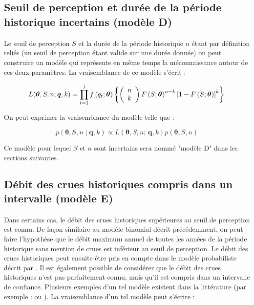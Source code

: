 	\subsection{Seuil de perception et durée de la période historique incertains (modèle D)}
	\label{subsec:modD}	
	
	\paragraph{}
	Le seuil de perception $S$ et la durée de la période historique $n$ étant par définition reliés (un seuil de perception étant valide sur une durée donnée) on peut construire un modèle qui représente en même temps la méconnaissance autour de ces deux paramètres. La vraisemblance de ce modèle s'écrit :  
	
					\begin{equation}
			L(\boldsymbol{\theta}, S, n ; \boldsymbol{q}, k) = \prod_{t=1}^j f\left(q_t;\boldsymbol{\theta}\right) \left\{\left(\begin{array}{l}
			n \\
			k
			\end{array}\right) F\left(S;\boldsymbol{\theta}\right)^{n-k}\left[1-F\left(S;\boldsymbol{\theta}\right)\right]^k\right\} \\
			\label{eq:Gev_Binom_SN}
			\end{equation}
		
		On peut exprimer la vraisemblance du modèle telle que :
					
			\begin{equation}
				p(\boldsymbol{\theta}, S, n \mid \boldsymbol{q},k) \propto L(\boldsymbol{\theta},S, n;\,\boldsymbol{q},k) p(\boldsymbol{\theta},S, n)
				\label{eq:Bayes_uSN}
			\end{equation}

	Ce modèle pour lequel $S$ et $n$ sont incertains sera nommé "modèle D" dans les sections suivantes. 
	
	\subsection{Débit des crues historiques compris dans un intervalle (modèle E)}
	\label{subsec:modE}	
		
	\paragraph{} Dans certains cas, le débit des crues historiques supérieures au seuil de perception est connu. De façon similaire au modèle binomial décrit précédemment, on peut faire l'hypothèse que le débit maximum annuel de toutes les années de la période historique sans mention de crues est inférieur au seuil de perception. Le débit des crues historiques peut ensuite être pris en compte dans le modèle probabiliste décrit par \citet{stedinger_flood_1986}. Il est également possible de considérer que le débit des crues historiques n'est pas parfaitement connu, mais qu'il est compris dans un intervalle de confiance. Plusieurs exemples d'un tel modèle existent dans la littérature (par exemple : \citet{payrastre_usefulness_2011} ou \citet{parkes_defining_2016}). La vraisemblance d'un tel modèle peut s'écrire : 

